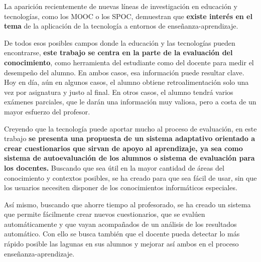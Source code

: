 La aparición recientemente de nuevas líneas de investigación en educación y tecnologías, como los \acrshort{MOOC} o los \acrshort{SPOC}, demuestran que \textbf{existe interés en el tema} de la aplicación de la tecnología a entornos de enseñanza-aprendizaje.

De todos esos posibles campos donde la educación y las tecnologías pueden encontrarse, \textbf{este trabajo se centra en la parte de la evaluación del conocimiento}, como herramienta del estudiante como del docente para medir el desempeño del alumno. En ambos casos, esa información puede resultar clave. Hoy en día, aún en algunos casos, el alumno obtiene retroalimentación solo una vez por asignatura y justo al final. En otros casos, el alumno tendrá varios exámenes parciales, que le darán una información muy valiosa, pero a costa de un mayor esfuerzo del profesor.

Creyendo que la tecnología puede aportar mucho al proceso de evaluación, en este trabajo \textbf{se presenta una propuesta de un sistema adaptativo orientado a crear cuestionarios que sirvan de apoyo al aprendizaje, ya sea como sistema de autoevaluación de los alumnos o sistema de evaluación para los docentes.} 
Buscando que sea útil en la mayor cantidad de áreas del conocimiento y  contextos posibles, se ha creado para que sea fácil de usar, sin que los usuarios necesiten disponer de los conocimientos informáticos especiales. 

Así mismo, buscando que ahorre tiempo al profesorado, se ha creado un sistema que permite fácilmente crear nuevos cuestionarios, que se evalúen automáticamente y que vayan acompañados de un análisis de los resultados automático. Con ello se busca también que el docente pueda detectar lo más rápido posible las lagunas en sus alumnos y mejorar así ambos en el proceso enseñanza-aprendizaje.




